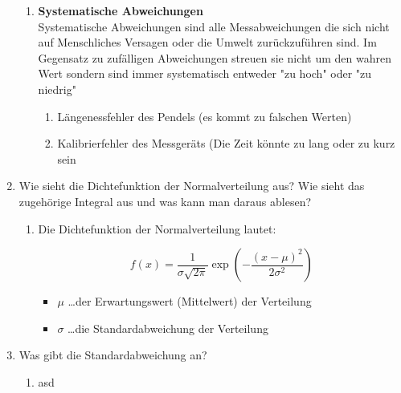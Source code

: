 \documentclass[fleqn,10pt]{olplainarticle}
\begin{document}
\begin{enumerate}
\begin{enumerate}
        \item \textbf{Systematische Abweichungen}  \\
            Systematische Abweichungen sind alle Messabweichungen die sich nicht auf Menschliches Versagen oder die Umwelt zurückzuführen sind. Im Gegensatz zu zufälligen Abweichungen streuen sie nicht um den wahren Wert sondern sind immer systematisch entweder "zu hoch" oder "zu niedrig"  
            \begin{enumerate}
                \item Längenessfehler des Pendels (es kommt zu falschen Werten)
                \item Kalibrierfehler des Messgeräts (Die Zeit könnte zu lang oder zu kurz sein
            \end{enumerate}
    \end{enumerate}
     \item Wie sieht die Dichtefunktion der Normalverteilung aus? Wie sieht das zugehörige Integral aus und was kann man daraus ablesen? 
     \begin{enumerate}
         \item Die Dichtefunktion der Normalverteilung lautet:
                
                \[
                f(x) = \frac{1}{\sigma \sqrt{2\pi}} \exp \left( - \frac{(x - \mu)^2}{2\sigma^2} \right)
                \]
                    \begin{itemize}
        \item \( \mu \) \dots der Erwartungswert (Mittelwert) der Verteilung
        \item \( \sigma \) \dots die Standardabweichung der Verteilung 
    \end{itemize}
     \end{enumerate}
     



     \item Was gibt die Standardabweichung an?  
     \begin{enumerate}
         \item asd
     \end{enumerate}
 \end{enumerate}
\end{document}
